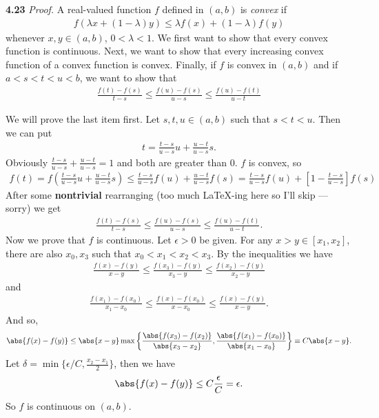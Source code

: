 \documentclass[11pt]{article}
\begin{document}
\noindent \textbf{4.23}
\noindent \textit{Proof.} A real-valued function $f$ defined in $(a,b)$ is \textit{convex} if 
\begin{align*}
f(\lambda x + (1-\lambda)y) \leq \lambda f(x) + (1-\lambda) f(y)
\end{align*} 
whenever $x,y \in (a,b)$, $0 < \lambda < 1$. We first want to show that every convex function is continuous. Next, we want to show that every increasing convex function of a convex function is convex. Finally, if $f$ is convex in $(a,b)$ and if $a<s<t<u<b$, we want to show that
\begin{align*}
\frac{f(t) - f(s)}{t-s} \leq \frac{f(u) - f(s)}{u-s} \leq \frac{f(u) - f(t)}{u-t}
\end{align*}

We will prove the last item first. Let $s,t,u \in (a,b)$ such that $s<t<u$. Then we can put
\begin{align*}
t = \frac{t-s}{u-s}u + \frac{u-t}{u-s}s.
\end{align*}
Obviously $\frac{t-s}{u-s} + \frac{u-t}{u-s} = 1$ and both are greater than 0. $f$ is convex, so
\begin{align*}
f(t) = f\left( \frac{t-s}{u-s}u + \frac{u-t}{u-s}s \right) \leq \frac{t-s}{u-s}f(u) + \frac{u-t}{u-s}f(s) = \frac{t-s}{u-s}f(u) + \left[1-\frac{t-s}{u-s}\right]f(s) 
\end{align*}
After some \textbf{nontrivial} rearranging (too much \LaTeX{}-ing here so I'll skip --- sorry) we get
\begin{align*}
\frac{f(t) - f(s)}{t-s} \leq \frac{f(u) - f(s)}{u-s} \leq \frac{f(u) - f(t)}{u-t}.
\end{align*}
Now we prove that $f$ is continuous. Let $\epsilon > 0$ be given. %
For any $x>y \in [x_1,x_2]$, there are also $x_0,x_3$ such that $x_0 < x_1 < x_2 < x_3$. By the inequalities we have
\begin{align*}
\frac{f(x) - f(y)}{x - y}  \leq  \frac{f(x_3)-f(y)}{x_3-y} \leq \frac{f(x_2)-f(y)}{x_2-y}
\end{align*}
and
\begin{align*}
\frac{f(x_1) - f(x_0)}{x_1 - x_0}  \leq  \frac{f(x)-f(x_0)}{x-x_0} \leq \frac{f(x)-f(y)}{x-y}.
\end{align*}
And so,
\begin{align*}
\abs{f(x) - f(y)} \leq \abs{x-y}\max\left\{ \frac{\abs{f(x_3) - f(x_2)}}{\abs{x_3 - x_2}}, \frac{\abs{f(x_1) - f(x_0)}}{\abs{x_1 - x_0}} \right\} \equiv C\abs{x-y}.
\end{align*}
Let $\delta = \min\{ \epsilon/C , \frac{x_2 - x_1}{2}\}$, then we have 
\begin{align*}
\abs{f(x) - f(y)} \leq C\frac{\epsilon}{C} = \epsilon.
\end{align*}
So $f$ is continuous on $(a,b)$. \\
\end{document}
